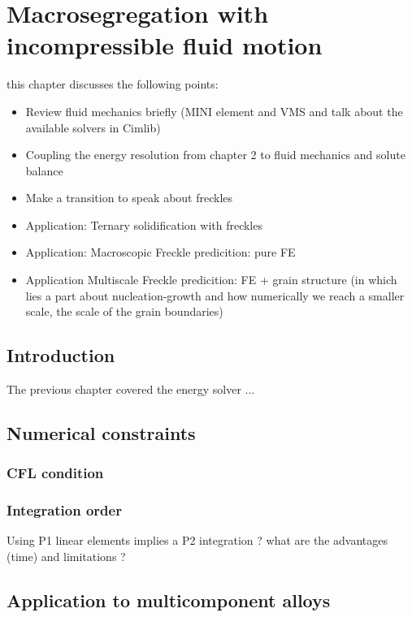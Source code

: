 \chapter{Macrosegregation with incompressible fluid motion}
\begin{nolinkcolors} 
\minitoc
\end{nolinkcolors}
\newpage

this chapter discusses the following points:
\begin{itemize}
\item Review fluid mechanics briefly (MINI element and VMS and talk about the available solvers in Cimlib)
\item Coupling the energy resolution from chapter 2 to fluid mechanics and solute balance
\item Make a transition to speak about freckles
\item Application: Ternary solidification with freckles
\item Application: Macroscopic Freckle predicition: pure FE
\item Application Multiscale Freckle predicition: FE + grain structure (in which lies a part about nucleation-growth and how numerically 
		we reach a smaller scale, the scale of the grain boundaries)
\end{itemize}

\section{Introduction}
The previous chapter covered the energy solver ...

\section{Numerical constraints}

\subsection{CFL condition}

\subsection{Integration order}
Using P1 linear elements implies a P2 integration ? what are the advantages (time) and limitations ?




\section{Application to multicomponent alloys}

